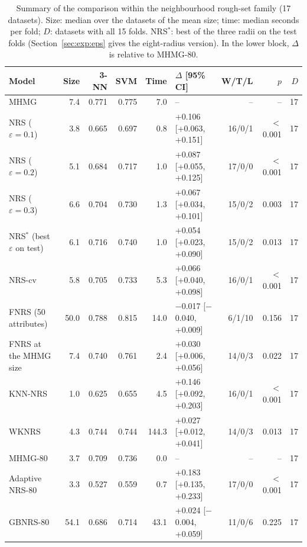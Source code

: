 \begin{table}[!t]
\centering
\caption{Summary of the comparison within the neighbourhood rough-set family (17 datasets). Size: median over the datasets of the mean size; time: median seconds per fold; $D$: datasets with all 15 folds. NRS$^*$: best of the three radii on the test folds (Section~\ref{sec:exp:eps} gives the eight-radius version). In the lower block, $\Delta$ is relative to MHMG-80.}
\label{tab:rs}
\footnotesize
\begin{tabular*}{\textwidth}{@{\extracolsep{\fill}}lrrrrlrrr@{}}
\toprule
Model & Size & 3-NN & SVM & Time & $\Delta$ [95\% CI] & W/T/L & $p$ & $D$ \\
\midrule
MHMG & 7.4 & 0.771 & 0.775 & 7.0 & -- & -- & -- & 17 \\
NRS ($\varepsilon=0.1$) & 3.8 & 0.665 & 0.697 & 0.8 & +0.106 [+0.063, +0.151] & 16/0/1 & $<$0.001 & 17 \\
NRS ($\varepsilon=0.2$) & 5.1 & 0.684 & 0.717 & 1.0 & +0.087 [+0.055, +0.125] & 17/0/0 & $<$0.001 & 17 \\
NRS ($\varepsilon=0.3$) & 6.6 & 0.704 & 0.730 & 1.3 & +0.067 [+0.034, +0.101] & 15/0/2 & 0.003 & 17 \\
NRS$^*$ (best $\varepsilon$ on test) & 6.1 & 0.716 & 0.740 & 1.0 & +0.054 [+0.023, +0.090] & 15/0/2 & 0.013 & 17 \\
NRS-cv & 5.8 & 0.705 & 0.733 & 5.3 & +0.066 [+0.040, +0.098] & 16/0/1 & $<$0.001 & 17 \\
FNRS (50 attributes) & 50.0 & 0.788 & 0.815 & 14.0 & $-$0.017 [$-$0.040, +0.009] & 6/1/10 & 0.156 & 17 \\
FNRS at the MHMG size & 7.4 & 0.740 & 0.761 & 2.4 & +0.030 [+0.006, +0.056] & 14/0/3 & 0.022 & 17 \\
KNN-NRS & 1.0 & 0.625 & 0.655 & 4.5 & +0.146 [+0.092, +0.203] & 16/0/1 & $<$0.001 & 17 \\
WKNRS & 4.3 & 0.744 & 0.744 & 144.3 & +0.027 [+0.012, +0.041] & 14/0/3 & 0.013 & 17 \\
\midrule
MHMG-80 & 3.7 & 0.709 & 0.736 & 0.0 & -- & -- & -- & 17 \\
Adaptive NRS-80 & 3.3 & 0.527 & 0.559 & 0.7 & +0.183 [+0.135, +0.233] & 17/0/0 & $<$0.001 & 17 \\
GBNRS-80 & 54.1 & 0.686 & 0.714 & 43.1 & +0.024 [$-$0.004, +0.059] & 11/0/6 & 0.225 & 17 \\
\bottomrule
\end{tabular*}
\end{table}
